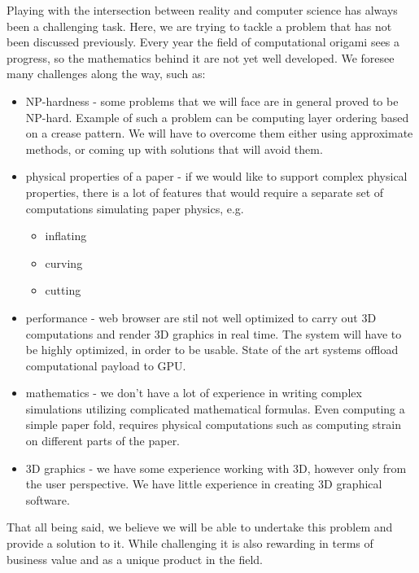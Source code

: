 \documentclass[english,12pt]{aghthesis}
\begin{document}
Playing with the intersection between reality and computer science has always been a challenging task. Here, we are trying to tackle a problem that has not been discussed previously.
Every year the field of computational origami sees a progress, so the mathematics behind it are not yet well developed. We foresee many challenges along the way, such as:
\begin{itemize}
	\item NP-hardness - some problems that we will face are in general proved to be NP-hard. Example of such a problem can be computing layer ordering based on a crease pattern. We will have to overcome them either using approximate methods, or coming up with solutions that will avoid them.

	\item physical properties of a paper - if we would like to support complex physical properties, there is a lot of features that would require a separate set of computations simulating paper physics, e.g.
		\begin{itemize}
			\item inflating
			\item curving 
			\item cutting
		\end{itemize}

	\item performance - web browser are stil not well optimized to carry out 3D computations and render 3D graphics in real time. The system will have to be highly optimized, in order to be usable. State of the art systems offload computational payload to GPU.

	\item mathematics - we don't have a lot of experience in writing complex simulations utilizing complicated mathematical formulas. Even computing a simple paper fold, requires physical computations such as computing strain on different parts of the paper.

	\item 3D graphics - we have some experience working with 3D, however only from the user perspective. We have little experience in creating 3D graphical software.

\end{itemize}

That all being said, we believe we will be able to undertake this problem and provide a solution to it.
While challenging it is also rewarding in terms of business value and as a unique product in the field.
\end{document}
